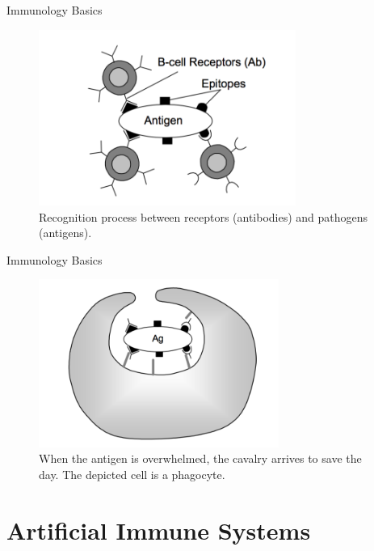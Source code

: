 \documentclass[xcolor=svgnames]{beamer}
\begin{document}
        \begin{frame}{Immunology Basics}
            \begin{figure}
                \centering
                \includegraphics[width=0.75\textwidth]{fig/recognition}
                \caption{Recognition process between receptors (antibodies) and pathogens (antigens).}
            \end{figure}
        \end{frame}
        
        \begin{frame}{Immunology Basics}
            \begin{figure}
                \centering
                \includegraphics[width=0.7\textwidth]{fig/phagocytosis}
                \caption{When the antigen is overwhelmed, the cavalry arrives to save the day. The depicted cell is a phagocyte.}
            \end{figure}
        \end{frame}
        
        \section{Artificial Immune Systems}
    
\end{document}
